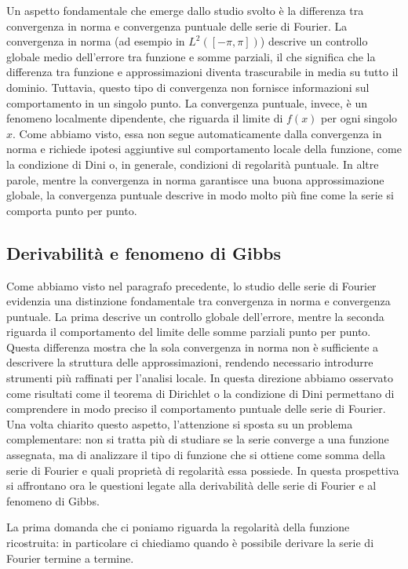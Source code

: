 \documentclass[a4paper,12pt]{report}
\begin{document}
Un aspetto fondamentale che emerge dallo studio svolto è la differenza tra convergenza in norma e convergenza puntuale delle serie di Fourier. La convergenza in norma (ad esempio in $L^2([-\pi,\pi])$) descrive un controllo globale medio dell’errore tra funzione e somme parziali, il che significa che la differenza tra funzione e approssimazioni diventa trascurabile in media su tutto il dominio. Tuttavia, questo tipo di convergenza non fornisce informazioni sul comportamento in un singolo punto. La convergenza puntuale, invece, è un fenomeno localmente dipendente, che riguarda il limite di $f(x)$ per ogni singolo $x$. Come abbiamo visto, essa non segue automaticamente dalla convergenza in norma e richiede ipotesi aggiuntive sul comportamento locale della funzione, come la condizione di Dini o, in generale, condizioni di regolarità puntuale. In altre parole, mentre la convergenza in norma garantisce una buona approssimazione globale, la convergenza puntuale descrive in modo molto più fine come la serie si comporta punto per punto.

\newpage

\subsection{Derivabilità e fenomeno di Gibbs}

Come abbiamo visto nel paragrafo precedente, lo studio delle serie di Fourier evidenzia una distinzione fondamentale tra convergenza in norma e convergenza puntuale. La prima descrive un controllo globale dell’errore, mentre la seconda riguarda il comportamento del limite delle somme parziali punto per punto. Questa differenza mostra che la sola convergenza in norma non è sufficiente a descrivere la struttura delle approssimazioni, rendendo necessario introdurre strumenti più raffinati per l’analisi locale. In questa direzione abbiamo osservato come risultati come il teorema di Dirichlet o la condizione di Dini permettano di comprendere in modo preciso il comportamento puntuale delle serie di Fourier. Una volta chiarito questo aspetto, l’attenzione si sposta su un problema complementare: non si tratta più di studiare se la serie converge a una funzione assegnata, ma di analizzare il tipo di funzione che si ottiene come somma della serie di Fourier e quali proprietà di regolarità essa possiede. In questa prospettiva si affrontano ora le questioni legate alla derivabilità delle serie di Fourier e al fenomeno di Gibbs.

La prima domanda che ci poniamo riguarda la regolarità della funzione ricostruita: in particolare ci chiediamo quando è possibile derivare la serie di Fourier termine a termine.
\end{document}
